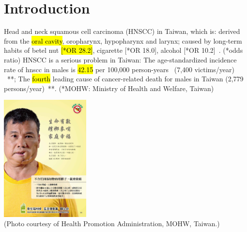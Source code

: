 \documentclass[
paper=landscape,
paper=160mm:90mm, %
fontsize=11pt, %
pagesize, %
parskip=half-, %
]{scrartcl} %
\theoremstyle{mythmstyle} %
\begin{document}





\section{Introduction}

\thispagestyle{headings}



\begin{minipage}[c]{0.60\linewidth}
\begin{outline}
    \1 Head and neck squamous cell carcinoma (HNSCC) in Taiwan, which is:
        \2 derived from the \hl{oral cavity}, oropharynx, hypopharynx and larynx;
        \2 caused by long-term habits of betel nut \hl{[*OR 28.2]}, cigarette [*OR 18.0], alcohol [*OR 10.2]~\autocite{Ko1995}. {\tiny (*odds ratio)}
    \1  HNSCC is a serious problem in Taiwan:
        \2 The age-standardized incidence rate of \acrshort{hnscc} in males is \hl{42.15} per 100,000 person-years~ (7,400 victims/year) ~\autocite{MOHWincidence2018}**;
        \2 The \hl{fourth} leading cause of cancer-related death for males in Taiwan (2,779 persons/year)~\autocite{MOHWdeath2017}**.
        {\tiny (*MOHW: Ministry of Health and Welfare, Taiwan)}
\end{outline}
\end{minipage}%
\begin{minipage}[c]{0.35\linewidth}
    \raggedright
    \hfill
    \includegraphics[width=4.5cm]{20369933_1755313531164078_5705495585669958017_o.jpg}\\
   \tiny (Photo courtesy of Health Promotion Administration, MOHW, Taiwan.)

\end{minipage}
\end{document}

